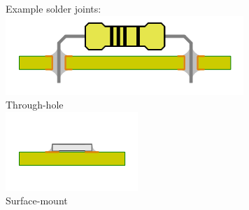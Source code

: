 \documentclass{beamer}
\begin{document}
\begin{frame}
\begin{columns}[t]
\begin{figure}
\centering
Example solder joints: \\
\vspace{20px}
\includegraphics[width=1.0\columnwidth]{images-dis1/pcb-pth} \\
Through-hole \\
\includegraphics[width=1.0\columnwidth]{images-dis1/pcb-smt} \\
Surface-mount
\end{figure}
\end{columns}
\end{frame}
\end{document}
